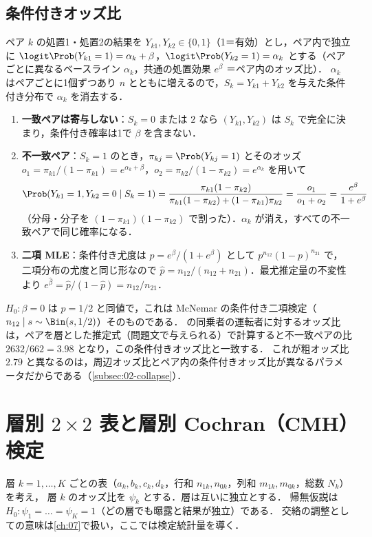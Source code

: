 \subsection{条件付きオッズ比}\label{subsec:04-condor}
ペア $k$ の処置1・処置2の結果を $Y_{k1},Y_{k2}\in\{0,1\}$（1＝有効）とし，ペア内で独立に
$\logit\Prob(Y_{k1}=1)=\alpha_k+\beta$，$\logit\Prob(Y_{k2}=1)=\alpha_k$ とする（ペアごとに異なるベースライン $\alpha_k$，共通の処置効果 $e^\beta$ ＝ペア内のオッズ比）．
$\alpha_k$ はペアごとに1個ずつあり $n$ とともに増えるので，$S_k=Y_{k1}+Y_{k2}$ を与えた条件付き分布で $\alpha_k$ を消去する．
\begin{enumerate}[label=(\roman*)]
\item \textbf{一致ペアは寄与しない}：$S_k=0$ または $2$ なら $(Y_{k1},Y_{k2})$ は $S_k$ で完全に決まり，条件付き確率は1で $\beta$ を含まない．
\item \textbf{不一致ペア}：$S_k=1$ のとき，$\pi_{kj}=\Prob(Y_{kj}=1)$ とそのオッズ $o_1=\pi_{k1}/(1-\pi_{k1})=e^{\alpha_k+\beta}$，$o_2=\pi_{k2}/(1-\pi_{k2})=e^{\alpha_k}$ を用いて
      \[
      \Prob(Y_{k1}=1,Y_{k2}=0\mid S_k=1)=\frac{\pi_{k1}(1-\pi_{k2})}{\pi_{k1}(1-\pi_{k2})+(1-\pi_{k1})\pi_{k2}}=\frac{o_1}{o_1+o_2}=\frac{e^\beta}{1+e^\beta}
      \]
      （分母・分子を $(1-\pi_{k1})(1-\pi_{k2})$ で割った）．$\alpha_k$ が消え，すべての不一致ペアで同じ確率になる．
\item \textbf{二項 MLE}：条件付き尤度は $p=e^\beta/(1+e^\beta)$ として $p^{n_{12}}(1-p)^{n_{21}}$ で，二項分布の尤度と同じ形なので
      $\hat p=n_{12}/(n_{12}+n_{21})$．最尤推定量の不変性より $e^{\hat\beta}=\hat p/(1-\hat p)=n_{12}/n_{21}$．
\end{enumerate}
$H_0:\beta=0$ は $p=1/2$ と同値で，これは McNemar の条件付き二項検定（$n_{12}\mid s\sim\Bin(s,1/2)$）そのものである．
 の同乗者の運転者に対するオッズ比は，ペアを層とした推定式（問題文で与えられる）で計算すると不一致ペアの比 $2632/662=3.98$ となり，この条件付きオッズ比と一致する．
これが粗オッズ比 $2.79$ と異なるのは，周辺オッズ比とペア内の条件付きオッズ比が異なるパラメータだからである（\cref{subsec:02-collapse}）．

\section{層別 \texorpdfstring{$2\times2$}{2×2} 表と層別 Cochran（CMH）検定}\label{sec:04-mh}
\Hinshutsu 層 $k=1,\dots,K$ ごとの表（$a_k,b_k,c_k,d_k$，行和 $n_{1k},n_{0k}$，列和 $m_{1k},m_{0k}$，総数 $N_k$）を考え，
層 $k$ のオッズ比を $\psi_k$ とする．層は互いに独立とする．
帰無仮説は $H_0:\psi_1=\dots=\psi_K=1$（どの層でも曝露と結果が独立）である．
交絡の調整としての意味は\cref{ch:07}で扱い，ここでは検定統計量を導く．


